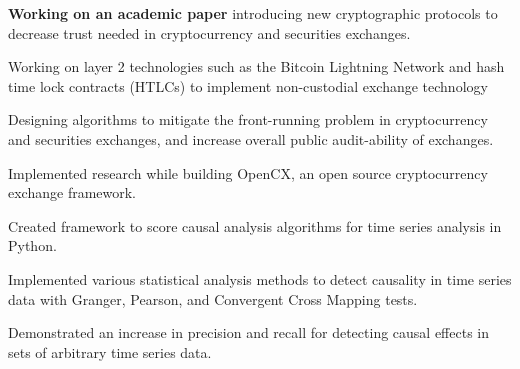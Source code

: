 
\begin{tightemize}
  \item \textbf{Working on an academic paper} introducing new cryptographic protocols to decrease trust needed in cryptocurrency and securities exchanges.
  \item Working on layer 2 technologies such as the Bitcoin Lightning Network and hash time lock contracts (HTLCs) to implement non-custodial exchange technology
  \item Designing algorithms to mitigate the front-running problem in cryptocurrency and securities exchanges, and increase overall public audit-ability of exchanges.
  \item Implemented research while building OpenCX, an open source cryptocurrency exchange framework.
\end{tightemize}
\subsectionsep

\begin{tightemize}
\item Created framework to score causal analysis algorithms for time series
  analysis in Python.
\item Implemented various statistical analysis methods to detect causality in
  time series data with Granger, Pearson, and Convergent Cross Mapping tests.
\item Demonstrated an increase in precision and recall for detecting causal effects in sets of
  arbitrary time series data.
\end{tightemize}
\subsectionsep

